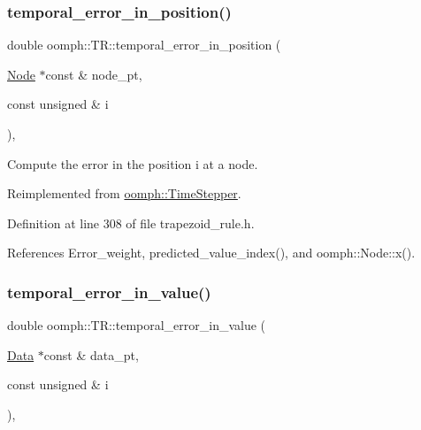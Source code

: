 \subsubsection{\texorpdfstring{temporal\+\_\+error\+\_\+in\+\_\+position()}{temporal\_error\_in\_position()}}
{\footnotesize\ttfamily double oomph\+::\+T\+R\+::temporal\+\_\+error\+\_\+in\+\_\+position (\begin{DoxyParamCaption}\item[{\hyperlink{classoomph_1_1Node}{Node} $\ast$const \&}]{node\+\_\+pt,  }\item[{const unsigned \&}]{i }\end{DoxyParamCaption})\hspace{0.3cm}{\ttfamily [inline]}, {\ttfamily [virtual]}}



Compute the error in the position i at a node. 



Reimplemented from \hyperlink{classoomph_1_1TimeStepper_ac463807aff4bcbedd6e8a463c7390536}{oomph\+::\+Time\+Stepper}.



Definition at line 308 of file trapezoid\+\_\+rule.\+h.



References Error\+\_\+weight, predicted\+\_\+value\+\_\+index(), and oomph\+::\+Node\+::x().

\mbox{\label{classoomph_1_1TR_afbaa1753914d49942f07b601563c2cec}} 
\subsubsection{\texorpdfstring{temporal\+\_\+error\+\_\+in\+\_\+value()}{temporal\_error\_in\_value()}}
{\footnotesize\ttfamily double oomph\+::\+T\+R\+::temporal\+\_\+error\+\_\+in\+\_\+value (\begin{DoxyParamCaption}\item[{\hyperlink{classoomph_1_1Data}{Data} $\ast$const \&}]{data\+\_\+pt,  }\item[{const unsigned \&}]{i }\end{DoxyParamCaption})\hspace{0.3cm}{\ttfamily [inline]}, {\ttfamily [virtual]}}



